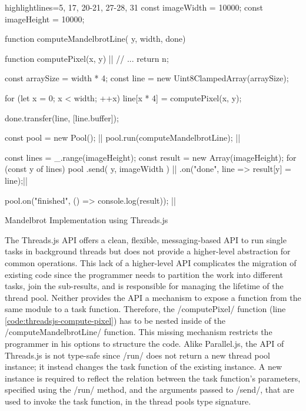 \begin{listing}
	\begin{javascriptcode*}{highlightlines={5, 17, 20-21, 27-28, 31}}
const imageWidth = 10000;
const imageHeight = 10000;

function computeMandelbrotLine({ y, width}, done) {
	function computePixel(x, y) {|$\label{code:threadsjs-compute-pixel}$|
		// ...
		return n;
	}
	
	const arraySize = width * 4;
	const line = new Uint8ClampedArray(arraySize);

	for (let x = 0; x < width; ++x) {
		line[x * 4] = computePixel(x, y);
	}

	done.transfer(line, [line.buffer]);
}

const pool = new Pool(); |$\label{code:threadsjs-pool}$|
pool.run(computeMandelbrotLine); |$\label{code:threadsjs-worker}$|

const lines = _.range(imageHeight);
const result = new Array(imageHeight);
for (const y of lines) {
	pool
		.send({ y, imageWidth }) |$\label{code:threadsjs-messaging}$|
		.on("done", line => result[y] = line);|$\label{code:threadsjs-task-completion}$|
}

pool.on("finished", () => console.log(result)); |$\label{code:threadsjs-done}$|
\end{javascriptcode*}
\caption{Mandelbrot Implementation using Threads.js}
\label{fig:mandelbrot-threadsjs}
\end{listing}


The Threads.js API offers a clean, flexible, messaging-based API to run single tasks in background threads but does not provide a higher-level abstraction for common operations. This lack of a higher-level API complicates the migration of existing code since the programmer needs to partition the work into different tasks, join the sub-results, and is responsible for managing the lifetime of the thread pool. Neither provides the API a mechanism to expose a function from the same module to a task function. Therefore, the \javascriptinline/computePixel/ function (line \ref{code:threadsjs-compute-pixel}) has to be nested inside of the \javascriptinline/computeMandelbrotLine/ function. This missing mechanism restricts the programmer in his options to structure the code. Alike Parallel.js, the API of Threads.js is not type-safe since \javascriptinline/run/ does not return a new thread pool instance; it instead changes the task function of the existing instance. A new instance is required to reflect the relation between the task function's parameters, specified using the \javascriptinline/run/ method, and the arguments passed to \javascriptinline/send/, that are used to invoke the task function, in the thread pools type signature.


